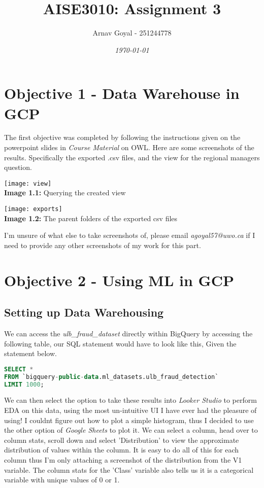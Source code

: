 \documentclass[]{report}
\title{\textbf{AISE3010: Assignment 3}}
\date{\textit{\today}}
\author{Arnav Goyal - 251244778}
\begin{document}
	
\maketitle

\section*{Objective 1 - Data Warehouse in GCP}

The first objective was completed by following the instructions given on the powerpoint slides in \textit{Course Material} on OWL. Here are some screenshots of the results. Specifically the exported .csv files, and the view for the regional managers question.

\begin{center}
	\centering
	\texttt{[image: view]} \\ 
	\textbf{Image 1.1:} Querying the created view
\end{center}

\begin{center}
	\centering
	\texttt{[image: exports]} \\ 
	\textbf{Image 1.2:} The parent folders of the exported csv files
\end{center}

I'm unsure of what else to take screenshots of, please email \textit{agoyal57@uwo.ca} if I need to provide any other screenshots of my work for this part.
\newpage

\section*{Objective 2 - Using ML in GCP}

\subsection*{Setting up Data Warehousing}

We can access the \textit{ulb\_fraud\_dataset} directly within BigQuery by accessing the following table, our SQL statement would have to look like this, Given the statement below.
\begin{lstlisting}[language=SQL]
SELECT * 
FROM `bigquery-public-data.ml_datasets.ulb_fraud_detection`
LIMIT 1000;
\end{lstlisting}
We can then select the option to take these results into \textit{Looker Studio} to perform EDA on this data, using the most un-intuitive UI I have ever had the pleasure of using! I couldnt figure out how to plot a simple histogram, thus I decided to use the other option of \textit{Google Sheets} to plot it. We can select a column, head over to column stats, scroll down and select 'Distribution' to view the approximate distribution of values within the column. It is easy to do all of this for each column thus I'm only attaching a screenshot of the distribution from the V1 variable. The column stats for the 'Class' variable also tells us it is a categorical variable with unique values of 0 or 1.
\end{document}
